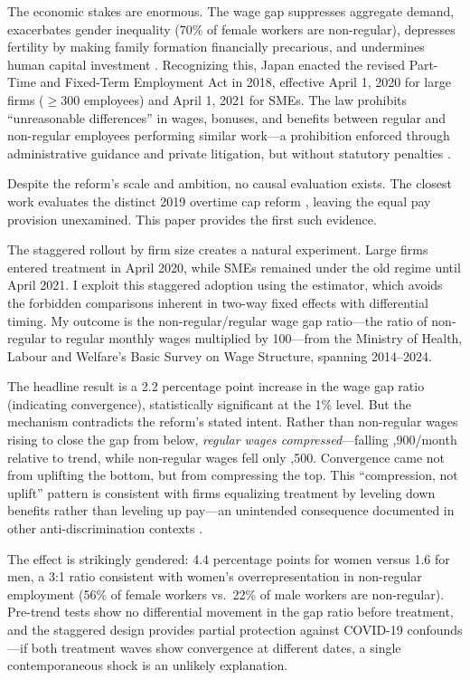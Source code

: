 \documentclass[12pt]{article}
\begin{document}
The economic stakes are enormous. The wage gap suppresses aggregate demand, exacerbates gender inequality (70\% of female workers are non-regular), depresses fertility by making family formation financially precarious, and undermines human capital investment \citep{abe2010equal}. Recognizing this, Japan enacted the revised Part-Time and Fixed-Term Employment Act in 2018, effective April 1, 2020 for large firms ($\geq$300 employees) and April 1, 2021 for SMEs. The law prohibits ``unreasonable differences'' in wages, bonuses, and benefits between regular and non-regular employees performing similar work---a prohibition enforced through administrative guidance and private litigation, but without statutory penalties \citep{mhlw2020equal}.

Despite the reform's scale and ambition, no causal evaluation exists. The closest work evaluates the distinct 2019 overtime cap reform \citep{burdin2024overtime}, leaving the equal pay provision unexamined. This paper provides the first such evidence.

The staggered rollout by firm size creates a natural experiment. Large firms entered treatment in April 2020, while SMEs remained under the old regime until April 2021. I exploit this staggered adoption using the \citet{callaway2021difference} estimator, which avoids the forbidden comparisons inherent in two-way fixed effects with differential timing. My outcome is the non-regular/regular wage gap ratio---the ratio of non-regular to regular monthly wages multiplied by 100---from the Ministry of Health, Labour and Welfare's Basic Survey on Wage Structure, spanning 2014--2024.

The headline result is a 2.2 percentage point increase in the wage gap ratio (indicating convergence), statistically significant at the 1\% level. But the mechanism contradicts the reform's stated intent. Rather than non-regular wages rising to close the gap from below, \textit{regular wages compressed}---falling ,900/month relative to trend, while non-regular wages fell only ,500. Convergence came not from uplifting the bottom, but from compressing the top. This ``compression, not uplift'' pattern is consistent with firms equalizing treatment by leveling down benefits rather than leveling up pay---an unintended consequence documented in other anti-discrimination contexts \citep{autor2006consequences, dube2019fairness}.

The effect is strikingly gendered: 4.4 percentage points for women versus 1.6 for men, a 3:1 ratio consistent with women's overrepresentation in non-regular employment (56\% of female workers vs.\ 22\% of male workers are non-regular). Pre-trend tests show no differential movement in the gap ratio before treatment, and the staggered design provides partial protection against COVID-19 confounds---if both treatment waves show convergence at different dates, a single contemporaneous shock is an unlikely explanation.
\end{document}
